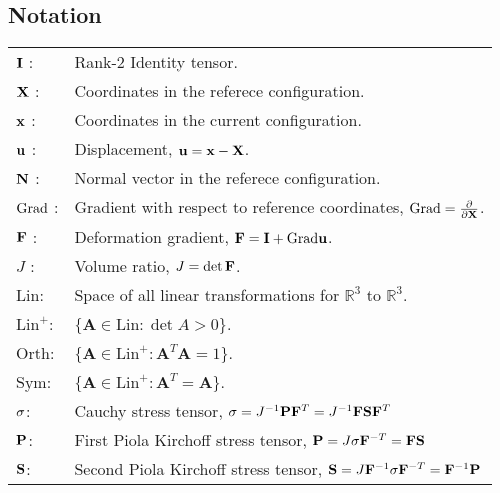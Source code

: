 \newenvironment{notation}%
    {\cleardoublepage\thispagestyle{empty}\null\vfill\begin{center}%
    \chapter*{Notation}\end{center}}%
    {\vfill\null}
        \begin{notation}
      
\begin{longtable}{ll}
  
  $\mathbf{I}$ :& Rank-2 Identity tensor. \\
  $\mathbf{X}$ :& Coordinates in the referece configuration. \\
  $\mathbf{x}$ :& Coordinates in the current configuration. \\
  $\mathbf{u}$ :& Displacement, $\mathbf{u} = \mathbf{x} - \mathbf{X}$. \\
  $\mathbf{N}$ :& Normal vector in the referece configuration. \\
  $\mathrm{Grad}$ :& Gradient with respect to reference coordinates, $\mathrm{Grad} = \frac{\partial}{\partial \mathbf{X}}$. \\
  $\mathbf{F}$ :& Deformation gradient, $\mathbf{F} = \mathbf{I} + \mathrm{Grad} \mathbf{u}$. \\
  $J$ :& Volume ratio, $J = \det \mathbf{F}$. \\
  $\mathrm{Lin}$: & Space of all linear transformations for $\mathbb{R}^3$ to $\mathbb{R}^3$.\\ 
  $\mathrm{Lin}^+$: & $\{ \mathbf{A} \in \mathrm{Lin} : \det A > 0 \}$. \\
  $\mathrm{Orth}$: & $\{ \mathbf{A} \in \mathrm{Lin}^+ : \mathbf{A}^T \mathbf{A} = 1 \}$. \\
  $\mathrm{Sym}$: & $\{ \mathbf{A} \in \mathrm{Lin}^+ : \mathbf{A}^T =  \mathbf{A}  \}$. \\
  $\mathbf{\sigma}$: & Cauchy stress tensor, $\mathbf{\sigma} = J^{-1}\mathbf{P} \mathbf{F}^{T} = J^{-1}\mathbf{F}\mathbf{S} \mathbf{F}^{T}$ \\
  $\mathbf{P}$: & First Piola Kirchoff stress tensor, $\mathbf{P} = J\mathbf{\sigma} \mathbf{F}^{-T} = \mathbf{F} \mathbf{S}$ \\
  $\mathbf{S}$: & Second Piola Kirchoff stress tensor, $\mathbf{S} = J\mathbf{F}^{-1}\mathbf{\sigma} \mathbf{F}^{-T} = \mathbf{F}^{-1} \mathbf{P}$ \\


    
\end{longtable}
\end{notation}